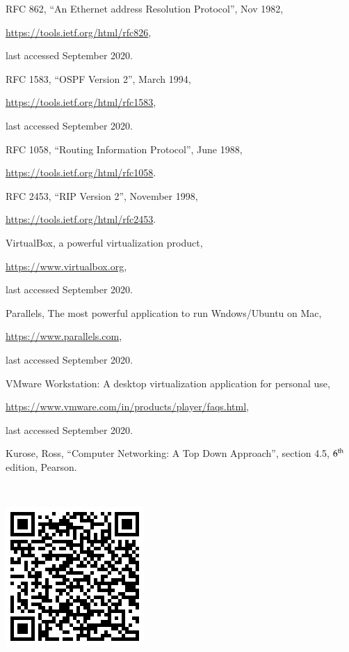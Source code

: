 \begin{multicols}{2}
\begin{thebibliography}{99}
 RFC 862, “An Ethernet address Resolution Protocol”, Nov 1982, 

\url{https://tools.ietf.org/html/rfc826},

last accessed September 2020.

 RFC 1583, “OSPF Version 2”, March 1994,

\url{ https://tools.ietf.org/html/rfc1583},

last accessed September 2020.

 RFC 1058, “Routing Information Protocol”, June 1988,

\url{https://tools.ietf.org/html/rfc1058}.

 RFC 2453, “RIP Version 2”, November 1998, 

\url{https://tools.ietf.org/html/rfc2453}.

 VirtualBox, a powerful virtualization product,

\url{https://www.virtualbox.org},

last accessed September 2020.

 Parallels, The most powerful application to run Wndows/Ubuntu on Mac,

\url{https://www.parallels.com},

last accessed September 2020.

 VMware Workstation: A desktop virtualization application for personal use,

\url{https://www.vmware.com/in/products/player/faqs.html},

last accessed September 2020.

 Kurose, Ross, “Computer Networking: A Top Down Approach”, section 4.5, $6^{\rm th}$ edition, Pearson.

\end{thebibliography}

\end{multicols}

~\\[-1.5cm]

\centerline{\includegraphics[scale=0.4]{src/Figures/experiential_learning-QR.png}}

